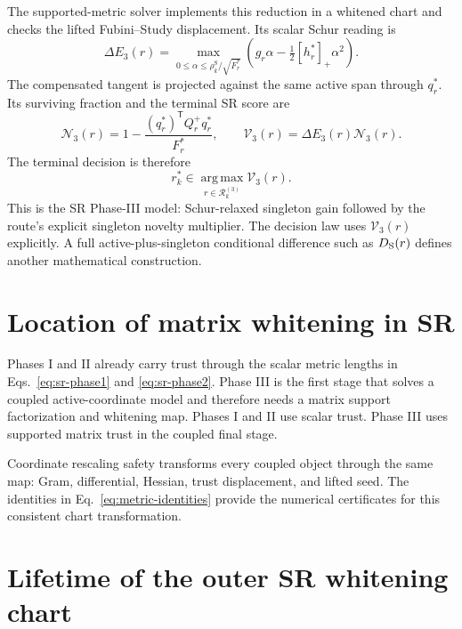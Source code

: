 \documentclass[10pt,twocolumn]{article}
\newcommand{\argmax}{\operatorname*{arg\,max}}
\begin{document}
The supported-metric solver implements this reduction in a whitened chart and
checks the lifted Fubini--Study displacement. Its scalar Schur reading is
\begin{equation}
\Delta E_3(r)=
\max_{0\leq\alpha\leq\rho_k^{\mathrm S}/\sqrt{F_r^*}}
\left(g_r\alpha-\tfrac12[h_r^*]_+\alpha^2\right).
\label{eq:sr-phase3}
\end{equation}
The compensated tangent is projected against the same active span through
\(q_r^*\). Its surviving fraction and the terminal SR score are
\begin{equation}
\mathcal N_3(r)=
1-\frac{(q_r^*)^{\mathsf T}Q_r^+q_r^*}{F_r^*},
\qquad
\mathcal V_3(r)=\Delta E_3(r)\mathcal N_3(r).
\label{eq:sr-phase3-novelty}
\end{equation}
The terminal decision is therefore
\begin{equation}
\boxed{
r_k^*\in\argmax_{r\in\mathcal R_k^{(3)}}\mathcal V_3(r).}
\label{eq:sr-decision}
\end{equation}
This is the SR Phase-III model: Schur-relaxed singleton gain followed by the
route's explicit singleton novelty multiplier. The decision law uses
\(\mathcal V_3(r)\) explicitly. A full active-plus-singleton conditional
difference such as \(D_{\rm S}(r)\) defines another mathematical construction.

\section*{Location of matrix whitening in SR}

Phases I and II already carry trust through the scalar metric lengths in
Eqs.~\eqref{eq:sr-phase1} and \eqref{eq:sr-phase2}. Phase III is the first
stage that solves a coupled active-coordinate model and therefore needs a
matrix support factorization and whitening map. Phases I and II use scalar
trust. Phase III uses supported matrix trust in the coupled final stage.

Coordinate rescaling safety transforms every coupled object through the same
map: Gram, differential, Hessian, trust displacement, and lifted seed. The
identities in Eq.~\eqref{eq:metric-identities} provide the numerical
certificates for this consistent chart transformation.

\section*{Lifetime of the outer SR whitening chart}
\end{document}

